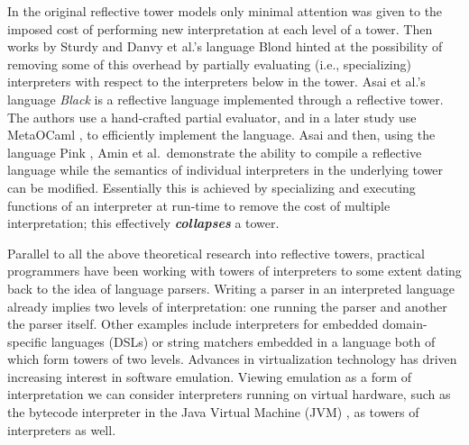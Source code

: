 \documentclass[a4paper,12pt,twoside,openright]{report}
\theoremstyle{definition}
\begin{document}
In the original reflective tower models only minimal attention was given to the imposed cost of performing new interpretation at each level of a tower. Then works by Sturdy \cite{sturdy1993lisp} and Danvy et al.'s language Blond \cite{danvy1988intensions} hinted at the possibility of removing some of this overhead by partially evaluating (i.e., specializing) interpreters with respect to the interpreters below in the tower. Asai et al.'s language \textit{Black} \cite{asai1996duplication} is a reflective language implemented through a reflective tower. The authors use a hand-crafted partial evaluator, and in a later study use MetaOCaml \cite{asai2015compiling}, to efficiently implement the language. Asai and then, using the language Pink \cite{amin2017collapsing}, Amin et al.~demonstrate the ability to compile a reflective language while the semantics of individual interpreters in the underlying tower can be modified. Essentially this is achieved by specializing and executing functions of an interpreter at run-time to remove the cost of multiple interpretation; this effectively \textbf{\textit{collapses}} a tower.

Parallel to all the above theoretical research into reflective towers, practical programmers have been working with towers of interpreters to some extent dating back to the idea of language parsers. Writing a parser in an interpreted language already implies two levels of interpretation: %
one running the parser and another the parser itself. Other examples include interpreters for embedded domain-specific languages (DSLs) or string matchers embedded in a language both of which form towers of two levels. Advances in virtualization technology has driven increasing interest in software emulation. Viewing emulation as a form of interpretation we can consider interpreters running on virtual hardware, such as the bytecode interpreter in the Java Virtual Machine (JVM) \cite{lindholm2014java}, as towers of interpreters as well.
\end{document}
